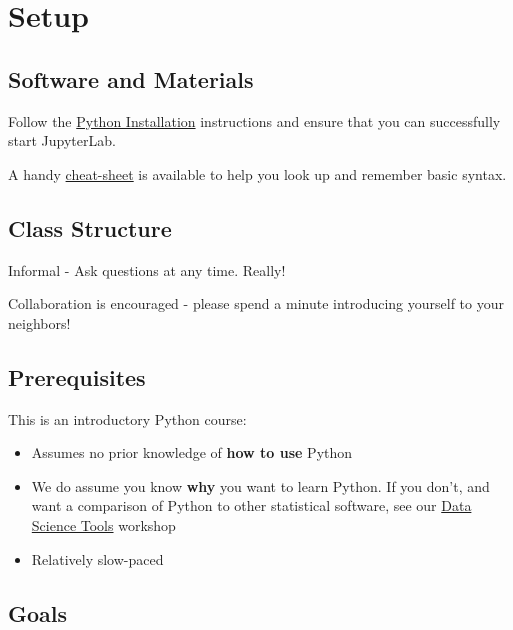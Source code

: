 \documentclass[
]{book}
\providecommand{\tightlist}{%
  \setlength{\itemsep}{0pt}\setlength{\parskip}{0pt}}
\begin{document}
\hypertarget{setup-4}{%
\section{Setup}\label{setup-4}}

\hypertarget{software-and-materials-4}{%
\subsection{Software and Materials}\label{software-and-materials-4}}

Follow the \href{./PythonInstall.html}{Python Installation} instructions and ensure that you can successfully start JupyterLab.

A handy \href{Python/PythonIntro/python-cheat-sheet-basic.pdf}{cheat-sheet} is available to help you look up and remember basic syntax.

\hypertarget{class-structure-4}{%
\subsection{Class Structure}\label{class-structure-4}}

Informal - Ask questions at any time. Really!

Collaboration is encouraged - please spend a minute introducing yourself to your neighbors!

\hypertarget{prerequisites-4}{%
\subsection{Prerequisites}\label{prerequisites-4}}

This is an introductory Python course:

\begin{itemize}
\tightlist
\item
  Assumes no prior knowledge of \textbf{how to use} Python
\item
  We do assume you know \textbf{why} you want to learn Python. If you don't, and want a comparison of Python to other statistical software, see our \href{./DataScienceTools.html}{Data Science Tools} workshop
\item
  Relatively slow-paced
\end{itemize}

\hypertarget{goals-3}{%
\subsection{Goals}\label{goals-3}}
\end{document}
